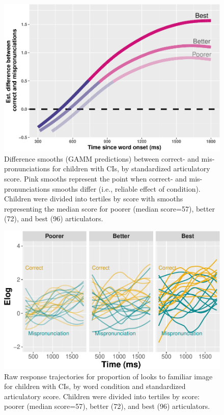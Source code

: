 \documentclass[
]{article}
\begin{document}
\begin{figure}
\centering
\includegraphics{2_modeling_files/figure-latex/CI-diff-plot-1.pdf}
\caption{\label{fig:CI-diff-plot}Difference smooths (GAMM predictions) between correct- and mis-pronunciations for children with CIs, by standardized articulatory score. Pink smooths represent the point when correct- and mis-pronunciations smooths differ (i.e., reliable effect of condition). Children were divided into tertiles by score with smooths representing the median score for poorer (median score=57), better (72), and best (96) articulators.}
\end{figure}

\begin{figure}
\centering
\includegraphics{2_modeling_files/figure-latex/CI-raw-plot-1.pdf}
\caption{\label{fig:CI-raw-plot}Raw response trajectories for proportion of looks to familiar image for children with CIs, by word condition and standardized articulatory score. Children were divided into tertiles by score: poorer (median score=57), better (72), and best (96) articulators.}
\end{figure}
\end{document}
